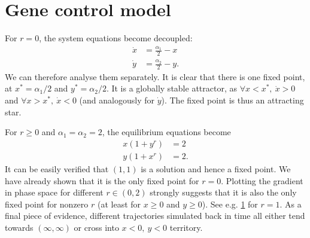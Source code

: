 \section{Gene control model}

For $r = 0$, the system equations become decoupled:
%
\begin{align*}
\dot{x} &= \frac{\alpha_1}{2} - x  \\
\dot{y} &= \frac{\alpha_2}{2} - y.
\end{align*}
%
We can therefore analyse them separately. It is clear that there is one fixed point, at $x^* = \alpha_1/2$ and $y^* = \alpha_2/2$. It is a globally stable attractor, as $\forall x < x^*,\ \dot{x} > 0$ and $\forall x > x^*,\ \dot{x} < 0$ (and analogously for $\dot{y}$). The fixed point is thus an attracting star.

For $r \geq 0$ and $\alpha_1 = \alpha_2 = 2$, the equilibrium equations become
%
\begin{align*}
x (1+y^r) &= 2 \\
y (1+x^r) &= 2.
\end{align*}
%
It can be easily verified that $(1,1)$ is a solution and hence a fixed point. We have already shown that it is the only fixed point for $r = 0$. Plotting the gradient in phase space for different $r \in (0, 2)$ strongly suggests that it is also the only fixed point for nonzero $r$ (at least for $x \geq 0$ and $y \geq 0$). See e.g. \cref{fig:pplane_r1} for $r = 1$. As a final piece of evidence, different trajectories simulated back in time all either tend towards $(\infty, \infty)$ or cross into $x < 0,\ y < 0$ territory.

\begin{figure}
\label{fig:pplane_r1}
\end{figure}
